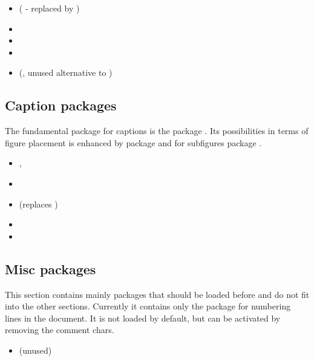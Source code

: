 \begin{itemize}[noitemsep]
\item (  - replaced by )
\item {}
\item {}
\item {}
\item (, unused alternative to )
\end{itemize}


\subsection{Caption packages}
\label{sec:packages:caption}

The fundamental package for captions is the package .  Its possibilities in terms of figure placement is enhanced by package  and for subfigures package .

\begin{itemize}[noitemsep]
\item {}, 
\item {}
\item {} (replaces )
\item {}
\item {}
\end{itemize}


\subsection{Misc packages}
\label{sec:packages:misc}
This section contains mainly packages that should be loaded before  and do not fit into the other sections.
Currently it contains only the package  for numbering lines
in the document. It is not loaded by default, but can be activated by removing the comment chars.

\begin{itemize}[noitemsep]
\item {} (unused)
\end{itemize}

